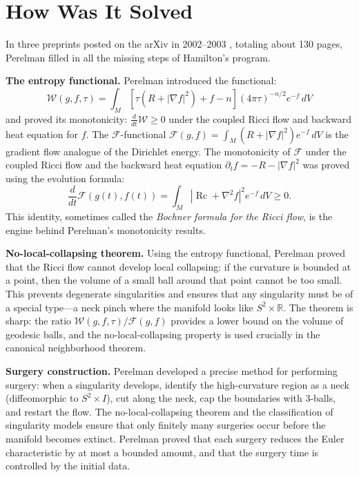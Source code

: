 \section{How Was It Solved}

In three preprints posted on the arXiv in 2002--2003 \cite{perelman2002}, totaling about 130 pages, Perelman \cite{perelman2002} filled in all the missing steps of Hamilton's program.

\textbf{The entropy functional.} Perelman \cite{perelman2002} introduced the functional:
\[
\mathcal{W}(g, f, \tau) = \int_M \left[ \tau(R + |\nabla f|^2) + f - n \right] (4\pi\tau)^{-n/2} e^{-f} \, dV
\]
and proved its monotonicity: $\frac{d}{dt} \mathcal{W} \ge 0$ under the coupled Ricci flow and backward heat equation for $f$. The $\mathcal{F}$-functional $\mathcal{F}(g,f) = \int_M (R + |\nabla f|^2) e^{-f} \, dV$ is the gradient flow analogue of the Dirichlet energy. The monotonicity of $\mathcal{F}$ under the coupled Ricci flow and the backward heat equation $\partial_t f = -R - |\nabla f|^2$ was proved using the evolution formula:
\[
\frac{d}{dt} \mathcal{F}(g(t), f(t)) = \int_M \left| \operatorname{Rc} + \nabla^2 f \right|^2 e^{-f} \, dV \ge 0.
\]
This identity, sometimes called the \emph{Bochner formula for the Ricci flow}, is the engine behind Perelman's monotonicity results.

\textbf{No-local-collapsing theorem.} Using the entropy functional, Perelman proved that the Ricci flow cannot develop local collapsing: if the curvature is bounded at a point, then the volume of a small ball around that point cannot be too small. This prevents degenerate singularities and ensures that any singularity must be of a special type---a neck pinch where the manifold looks like $S^2 \times \mathbb{R}$. The theorem is sharp: the ratio $\mathcal{W}(g,f,\tau) / \mathcal{F}(g,f)$ provides a lower bound on the volume of geodesic balls, and the no-local-collapsing property is used crucially in the canonical neighborhood theorem.

\textbf{Surgery construction.} Perelman developed a precise method for performing surgery: when a singularity develops, identify the high-curvature region as a neck (diffeomorphic to $S^2 \times I$), cut along the neck, cap the boundaries with 3-balls, and restart the flow. The no-local-collapsing theorem and the classification of singularity models ensure that only finitely many surgeries occur before the manifold becomes extinct. Perelman proved that each surgery reduces the Euler characteristic by at most a bounded amount, and that the surgery time is controlled by the initial data.

